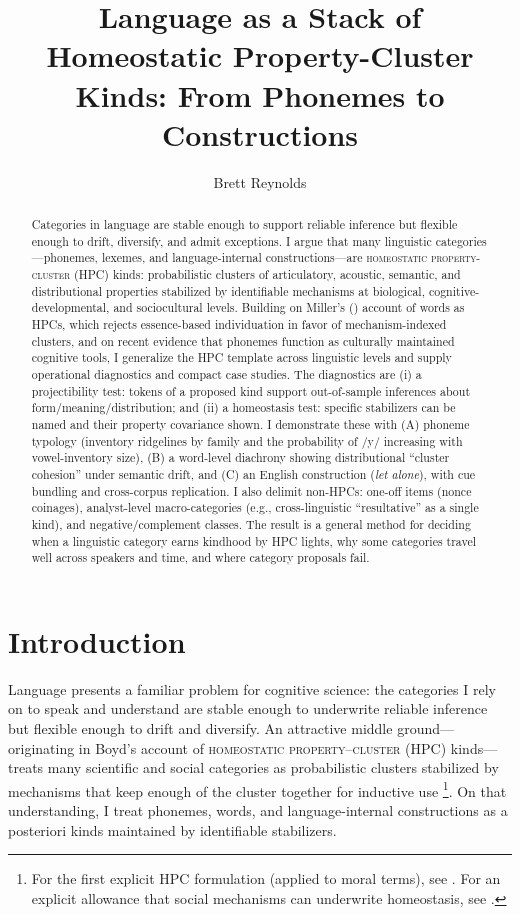 \documentclass[12pt]{article}
\title{Language as a Stack of Homeostatic Property-Cluster Kinds: From Phonemes to Constructions}
\author{Brett Reynolds}
\date{}
\begin{document}
\maketitle
\doublespacing

\begin{abstract}
\noindent Categories in language are stable enough to support reliable inference but flexible enough to drift, diversify, and admit exceptions. I argue that many linguistic categories---phonemes, lexemes, and language-internal constructions---are \textsc{homeostatic property-cluster} (HPC) kinds: probabilistic clusters of articulatory, acoustic, semantic, and distributional properties stabilized by identifiable mechanisms at biological, cognitive-developmental, and sociocultural levels. Building on Miller's (\citeyear{Miller2021WordsSpeciesKinds}) account of words as HPCs, which rejects essence-based individuation in favor of mechanism-indexed clusters, and on recent evidence that phonemes function as culturally maintained cognitive tools, I generalize the HPC template across linguistic levels and supply operational diagnostics and compact case studies. The diagnostics are (i) a projectibility test: tokens of a proposed kind support out-of-sample inferences about form/meaning/distribution; and (ii) a homeostasis test: specific stabilizers can be named and their property covariance shown. I demonstrate these with (A) phoneme typology (inventory ridgelines by family and the probability of /y/ increasing with vowel-inventory size), (B) a word-level diachrony showing distributional ``cluster cohesion'' under semantic drift, and (C) an English construction (\textit{let alone}), with cue bundling and cross-corpus replication. I also delimit non-HPCs: one-off items (nonce coinages), analyst-level macro-categories (e.g., cross-linguistic ``resultative'' as a single kind), and negative/complement classes. The result is a general method for deciding when a linguistic category earns kindhood by HPC lights, why some categories travel well across speakers and time, and where category proposals fail.
\end{abstract}

\section{Introduction}
Language presents a familiar problem for cognitive science: the categories I rely on to speak and understand are stable enough to underwrite reliable inference but flexible enough to drift and diversify. An attractive middle ground---originating in Boyd’s account of \textsc{homeostatic property–cluster} (HPC) kinds---treats many scientific and social categories as probabilistic clusters stabilized by mechanisms that keep enough of the cluster together for inductive use \citep{Boyd1991Enthusiasm,Boyd1999Homeostasis}\footnote{For the first explicit HPC formulation (applied to moral terms), see \citet[§3.8]{Boyd1988MoralRealist}. For an explicit allowance that social mechanisms can underwrite homeostasis, see \citet{Boyd2000Workmanship}.}. On that understanding, I treat phonemes, words, and language-internal constructions as a posteriori kinds maintained by identifiable stabilizers.
\end{document}

